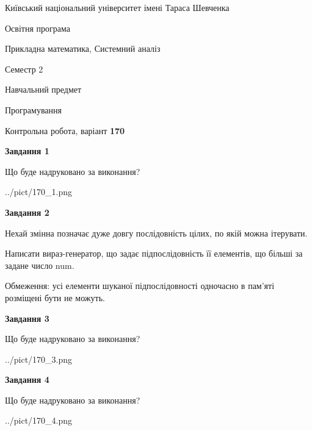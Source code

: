 \documentclass[12pt, ukrainian]{article}
\begin{document}
{{\begin {small}\par
{ \center  Київський національний університет імені Тараса Шевченка \par}
{\parbox {5 cm}{Освітня програма \hfill}{\parbox {8 cm}{Прикладна математика, Системний аналіз \hfill}}\parbox {5 cm}{\hfill Семестр 2}}\par
{\parbox {5 cm} {Навчальний предмет \hfill}\parbox {7 cm}{Програмування \hfill}\parbox {6cm}{\hfill}\par}\vspace{-7pt} \end{small}}{\center Контрольна робота, варіант  \No \textbf
{ 170 }\par}}
{
\begin {large}
{\begin {center}\textbf{Завдання 1}\end {center}}\par
Що буде надруковано за виконання?\par\par
\begin{center}
	{../pict/170_1.png}
\end{center}
\newpage

{\begin {center}\textbf{Завдання 2}\end {center}}\par
Нехай змінна  позначає дуже довгу послідовність цілих, по якій можна ітерувати.

Написати вираз-генератор, що задає підпослідовність її елементів, що більші за задане число num.

Обмеження: усі елементи шуканої підпослідовності одночасно в пам'яті розміщені бути не можуть.\par
\newpage

{\begin {center}\textbf{Завдання 3}\end {center}}\par
Що буде надруковано за виконання?
\begin{center}
	{../pict/170_3.png}
\end{center}
\newpage

{\begin {center}\textbf{Завдання 4}\end {center}}\par
Що буде надруковано за виконання?\par
\begin{center}
	{../pict/170_4.png}
\end{center}
\newpage


\end{large}}
\end{document}

